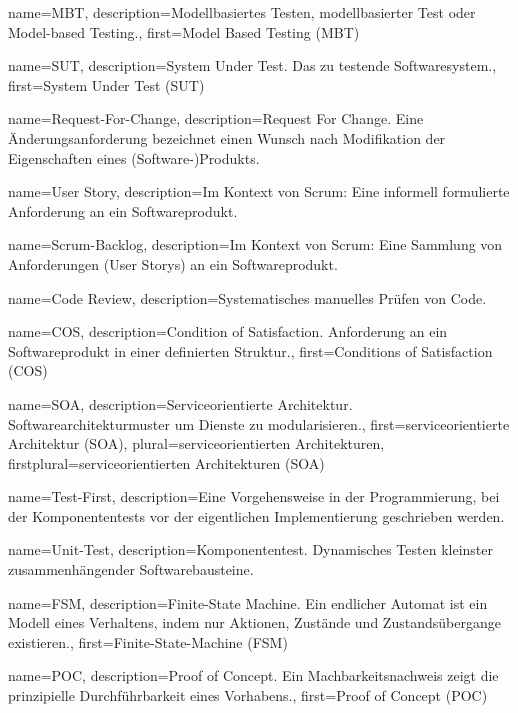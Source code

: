  {
	name={MBT},
	description={Modellbasiertes Testen, modellbasierter Test oder Model-based Testing.},
	first={Model Based Testing (MBT)}
}

 {
	name={SUT},
	description={System Under Test. Das zu testende Softwaresystem.},
	first={System Under Test (SUT)}
}

 {
	name={Request-For-Change},
	description={Request For Change. Eine Änderungsanforderung bezeichnet einen  Wunsch nach Modifikation der Eigenschaften eines (Software-)Produkts.}
}

 {
	name={User Story},
	description={Im Kontext von Scrum: Eine informell formulierte Anforderung an ein Softwareprodukt.}
}

 {
	name={Scrum-Backlog},
	description={Im Kontext von Scrum: Eine Sammlung von Anforderungen (User Storys) an ein Softwareprodukt.}
}

 {
	name={Code Review},
	description={Systematisches manuelles Prüfen von Code.}
}

 {
	name={COS},
	description={Condition of Satisfaction. Anforderung an ein Softwareprodukt in einer definierten Struktur.},
	first={Conditions of Satisfaction (COS)}
}

 {
	name={SOA},
	description={Serviceorientierte Architektur. Softwarearchitekturmuster um Dienste zu modularisieren.},
	first={serviceorientierte Architektur (SOA)},
	plural={serviceorientierten Architekturen},
	firstplural={serviceorientierten Architekturen (SOA)}
}

 {
	name={Test-First},
	description={Eine Vorgehensweise in der Programmierung, bei der Komponententests vor der eigentlichen Implementierung geschrieben werden.}
}

 {
	name={Unit-Test},
	description={Komponententest. Dynamisches Testen kleinster zusammenhängender Softwarebausteine.}
}

 {
	name={FSM},
	description={Finite-State Machine. Ein endlicher Automat ist ein Modell eines Verhaltens, indem nur Aktionen, Zustände und Zustandsübergange existieren.},
	first={Finite-State-Machine (FSM)}
}

 {
	name={POC},
	description={Proof of Concept. Ein Machbarkeitsnachweis zeigt die prinzipielle Durchführbarkeit eines Vorhabens.},
	first={Proof of Concept (POC)}
}

